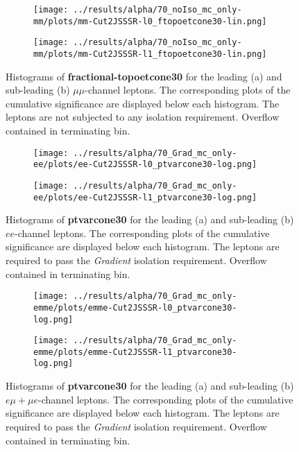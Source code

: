\begin{figure}
\centering
\begin{subfigure}{.65\textwidth}
  \centering
  \texttt{[image: ../results/alpha/70\_noIso\_mc\_only-mm/plots/mm-Cut2JSSSR-l0\_ftopoetcone30-lin.png]}
  \caption{}
  \label{mm_leading_topoetcone}
\end{subfigure}
\begin{subfigure}{.65\textwidth}
 \centering
  \texttt{[image: ../results/alpha/70\_noIso\_mc\_only-mm/plots/mm-Cut2JSSSR-l1\_ftopoetcone30-lin.png]}
  \caption{}
  \label{mm_subleading_topoetcone}
\end{subfigure}
\caption{Histograms of \textbf{fractional-topoetcone30} for the leading (a) and sub-leading (b) $\mu\mu$-channel leptons. The corresponding plots of the cumulative significance are displayed below each histogram. The leptons are not subjected to any isolation requirement. Overflow contained in terminating bin.}
\label{ftopoetcone30_isoplots_noIso_mm}
\end{figure}
\begin{figure}
\centering
\begin{subfigure}{.65\textwidth}
  \centering
  \texttt{[image: ../results/alpha/70\_Grad\_mc\_only-ee/plots/ee-Cut2JSSSR-l0\_ptvarcone30-log.png]}
  \caption{}
  \label{ee_leading_topoetcone}
\end{subfigure}
\begin{subfigure}{.65\textwidth}
 \centering
  \texttt{[image: ../results/alpha/70\_Grad\_mc\_only-ee/plots/ee-Cut2JSSSR-l1\_ptvarcone30-log.png]}
  \caption{}
  \label{ee_subleading_topoetcone}
\end{subfigure}
\caption{Histograms of \textbf{ptvarcone30} for the leading (a) and sub-leading (b) $ee$-channel leptons. The corresponding plots of the cumulative significance are displayed below each histogram. The leptons are required to pass the \textit{Gradient} isolation requirement. Overflow contained in terminating bin.}
\label{ptvarcone30_isoplots_wGrad_ee}
\end{figure}
\begin{figure}
\centering
\begin{subfigure}{.65\textwidth}
  \centering
  \texttt{[image: ../results/alpha/70\_Grad\_mc\_only-emme/plots/emme-Cut2JSSSR-l0\_ptvarcone30-log.png]}
  \caption{}
  \label{emme_leading_topoetcone}
\end{subfigure}
\begin{subfigure}{.65\textwidth}
 \centering
  \texttt{[image: ../results/alpha/70\_Grad\_mc\_only-emme/plots/emme-Cut2JSSSR-l1\_ptvarcone30-log.png]}
  \caption{}
  \label{emme_subleading_topoetcone}
\end{subfigure}
\caption{Histograms of \textbf{ptvarcone30} for the leading (a) and sub-leading (b) $e\mu+ \mu e$-channel leptons. The corresponding plots of the cumulative significance are displayed below each histogram. The leptons are required to pass the \textit{Gradient} isolation requirement. Overflow contained in terminating bin.}
\label{ptvarcone30_isoplots_wGrad_emme}
\end{figure}
